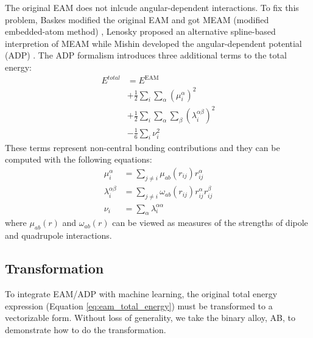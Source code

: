 \documentclass[prb,reprint]{revtex4-2}
\begin{document}
The original EAM does not inlcude angular-dependent interactions. To 
fix this problem, Baskes modified the original EAM and got MEAM (modified 
embedded-atom method) \cite{MEAM0}, Lenosky proposed an alternative spline-based 
interpretion of MEAM \cite{MEAM_Lenosky} while Mishin developed the 
angular-dependent potential (ADP) \cite{ADP0,ADP1,ADP2,ADP3,ADP4}. The ADP 
formalism introduces three additional terms to the total energy:
\begin{align}
\label{eq:adp}
E^{total} 
& = E^{\mathrm{EAM}} \nonumber \\
& + \frac{1}{2}\sum_{i}{\sum_{\alpha}{(\mu_{i}^{\alpha})^2}} \nonumber \\
& + \frac{1}{2}\sum_{i}{
    \sum_{\alpha}{\sum_{\beta}{(\lambda_{i}^{\alpha\beta})^2}}} \nonumber \\
& - \frac{1}{6}\sum_{i}{\nu_{i}^{2}}
\end{align}
These terms represent non-central bonding contributions and they can be computed
with the following equations:
\begin{align}
\label{eq:adp_mu}
\mu_{i}^{\alpha} & = \sum_{j \neq i}{\mu_{ab}(r_{ij}) r_{ij}^{\alpha}} \\
\label{eq:adp_lambda}
\lambda_{i}^{\alpha\beta} & = \sum_{j \neq i}{
    \omega_{ab}(r_{ij}) r_{ij}^{\alpha}r_{ij}^{\beta}} \\
\label{eq:adp_nu}
\nu_{i} & = \sum_{\alpha}{\lambda_{i}^{\alpha\alpha}}
\end{align}
where $\mu_{ab}(r)$ and $\omega_{ab}(r)$ can be viewed as measures of the 
strengths of dipole and quadrupole interactions.

\subsection{Transformation}
\label{sec:transformation}

To integrate EAM/ADP with machine learning, the original total energy expression 
(Equation \ref{eq:eam_total_energy}) must be transformed to a vectorizable form. 
Without loss of generality, we take the binary alloy, AB, to demonstrate how to 
do the transformation.

\newcommand{\niaa}{N_{i}^{\mathrm{AA}}}
\newcommand{\niab}{N_{i}^{\mathrm{AB}}}
\newcommand{\njbb}{N_{j}^{\mathrm{BB}}}
\newcommand{\njba}{N_{j}^{\mathrm{BA}}}
\newcommand{\riaa}{\vec{\mathbf{r}}_{i}^{\mathrm{AA}}}
\newcommand{\riab}{\vec{\mathbf{r}}_{i}^{\mathrm{AB}}}
\newcommand{\ribb}{\vec{\mathbf{r}}_{i}^{\mathrm{BB}}}
\newcommand{\riba}{\vec{\mathbf{r}}_{i}^{\mathrm{BA}}}
\newcommand{\namax}{N_{\mathrm{A}}^{\mathrm{max}}}
\newcommand{\nbmax}{N_{\mathrm{B}}^{\mathrm{max}}}
\newcommand{\nnl}{N^{\mathrm{nl}}}
\newcommand{\nnli}{N^{\mathrm{nl}}_i}
\end{document}
